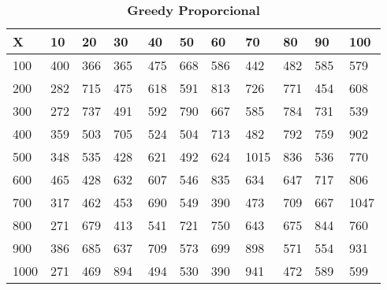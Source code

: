 \documentclass[10pt,letterpaper]{article}
\begin{document}
\begin{center}
\begin{table}\renewcommand{\arraystretch}{2.5}
\caption{\large \textbf{Greedy Proporcional}}
\centering
\begin{tabular} { |m{0.5cm}|m{1.3cm}|m{1.3cm}|m{1.3cm}|m{1.3cm}|m{1.3cm}|m{1.3cm}|m{1.3cm}|m{1.3cm}|m{1.3cm}|m{1.3cm}|} 
\hline
\rowcolor{Gray}
\centering \textbf{X} & \centering \textbf{10} & \centering \textbf{20} & \centering \textbf{30}\ & \centering \textbf{40} & \centering \textbf{50} & \centering \textbf{60}\ & \centering \textbf{70} & \centering \textbf{80} & \centering \textbf{90}\ & \textbf{100} \\\hline
\cellcolor{Gray}100 & \Large 400 & \Large 366 & \Large 365 & \Large 475 & \Large 668 & \Large 586 & \Large 442 & \Large 482 & \Large 585 & \Large 579 \\
\hline
\cellcolor{Gray}200 & \Large 282 & \Large 715 & \Large 475 & \Large 618 & \Large 591 & \Large 813 & \Large 726 & \Large 771 & \Large 454 & \Large 608 \\
\hline
\cellcolor{Gray}300 & \Large 272 & \Large 737 & \Large 491 & \Large 592 & \Large 790 & \Large 667 & \Large 585 & \Large 784 & \Large 731 & \Large 539 \\
\hline
\cellcolor{Gray}400 & \Large 359 & \Large 503 & \Large 705 & \Large 524 & \Large 504 & \Large 713 & \Large 482 & \Large 792 & \Large 759 & \Large 902 \\
\hline
\cellcolor{Gray}500 & \Large 348 & \Large 535 & \Large 428 & \Large 621 & \Large 492 & \Large 624 & \Large 1015 & \Large 836 & \Large 536 & \Large 770 \\
\hline
\cellcolor{Gray}600 & \Large 465 & \Large 428 & \Large 632 & \Large 607 & \Large 546 & \Large 835 & \Large 634 & \Large 647 & \Large 717 & \Large 806 \\
\hline
\cellcolor{Gray}700 & \Large 317 & \Large 462 & \Large 453 & \Large 690 & \Large 549 & \Large 390 & \Large 473 & \Large 709 & \Large 667 & \Large 1047 \\
\hline
\cellcolor{Gray}800 & \Large 271 & \Large 679 & \Large 413 & \Large 541 & \Large 721 & \Large 750 & \Large 643 & \Large 675 & \Large 844 & \Large 760 \\
\hline
\cellcolor{Gray}900 & \Large 386 & \Large 685 & \Large 637 & \Large 709 & \Large 573 & \Large 699 & \Large 898 & \Large 571 & \Large 554 & \Large 931 \\
\hline
\cellcolor{Gray}1000 & \Large 271 & \Large 469 & \Large 894 & \Large 494 & \Large 530 & \Large 390 & \Large 941 & \Large 472 & \Large 589 & \Large 599 \\
\hline
\end{tabular} \\
\end{table}
\end{center}
\end{document}
